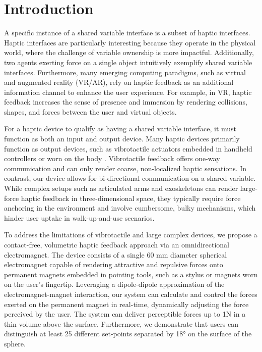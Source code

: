 \section{Introduction}
A specific instance of a shared variable interface is a subset of haptic interfaces. Haptic interfaces are particularly interesting because they operate in the physical world, where the challenge of variable ownership is more impactful. Additionally, two agents exerting force on a single object intuitively exemplify shared variable interfaces. Furthermore, many emerging computing paradigms, such as virtual and augmented reality (VR/AR), rely on haptic feedback as an additional information channel to enhance the user experience. For example, in VR, haptic feedback increases the sense of presence and immersion by rendering collisions, shapes, and forces between the user and virtual objects.

For a haptic device to qualify as having a shared variable interface, it must function as both an input and output device. Many haptic devices primarily function as output devices, such as vibrotactile actuators embedded in handheld controllers \cite{whitmire2018haptic} or worn on the body \cite{hinchet2018dextres}. Vibrotactile feedback offers one-way communication and can only render coarse, non-localized haptic sensations. In contrast, our device allows for bi-directional communication on a shared variable. While complex setups such as articulated arms and exoskeletons can render large-force haptic feedback in three-dimensional space, they typically require force anchoring in the environment and involve cumbersome, bulky mechanisms, which hinder user uptake in walk-up-and-use scenarios.

To address the limitations of vibrotactile and large complex devices, we propose a contact-free, volumetric haptic feedback approach via an omnidirectional electromagnet. The device consists of a single 60 mm diameter spherical electromagnet capable of rendering attractive and repulsive forces onto permanent magnets embedded in pointing tools, such as a stylus or magnets worn on the user's fingertip. Leveraging a dipole-dipole approximation of the electromagnet-magnet interaction, our system can calculate and control the forces exerted on the permanent magnet in real-time, dynamically adjusting the force perceived by the user. The system can deliver perceptible forces up to 1N in a thin volume above the surface. Furthermore, we demonstrate that users can distinguish at least 25 different set-points separated by 18° on the surface of the sphere.

